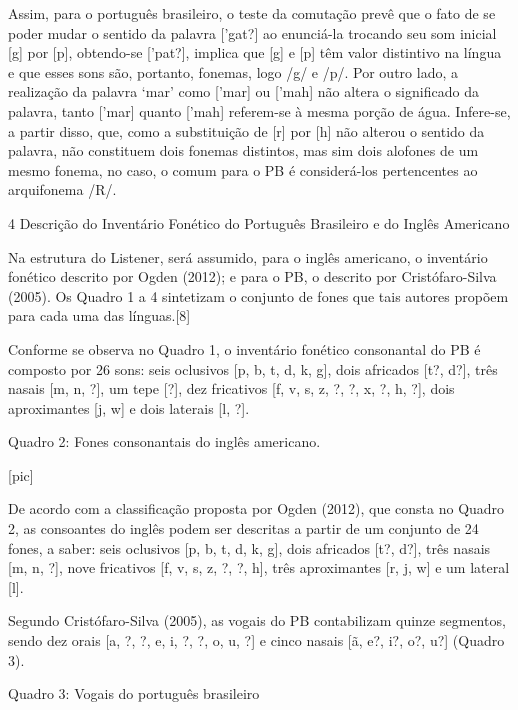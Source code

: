 Assim, para o portugu\^es brasileiro, o teste da comuta\c{c}\~ao prev\^e que o
fato de se poder mudar o sentido da palavra {[}'gat?{]} ao enunci\'a-la
trocando seu som inicial {[}g{]} por {[}p{]}, obtendo-se {[}'pat?{]},
implica que {[}g{]} e {[}p{]} t\^em valor distintivo na l\'ingua e que esses
sons s\~ao, portanto, fonemas, logo /g/ e /p/. Por outro lado, a
realiza\c{c}\~ao da palavra `mar' como {[}'mar{]} ou {[}'mah{]} n\~ao altera o
significado da palavra, tanto {[}'mar{]} quanto {[}'mah{]} referem-se à
mesma por\c{c}\~ao de \'agua. Infere-se, a partir disso, que, como a
substitui\c{c}\~ao de {[}r{]} por {[}h{]} n\~ao alterou o sentido da palavra,
n\~ao constituem dois fonemas distintos, mas sim dois alofones de um mesmo
fonema, no caso, o comum para o PB \'e consider\'a-los pertencentes ao
arquifonema /R/.

4 Descri\c{c}\~ao do Invent\'ario Fon\'etico do Portugu\^es Brasileiro e do Ingl\^es
Americano

Na estrutura do Listener, ser\'a assumido, para o ingl\^es americano, o
invent\'ario fon\'etico descrito por Ogden (2012); e para o PB, o descrito
por Crist\'ofaro-Silva (2005). Os Quadro 1 a 4 sintetizam o conjunto de
fones que tais autores prop\~oem para cada uma das l\'inguas.{[}8{]}



Conforme se observa no Quadro 1, o invent\'ario fon\'etico consonantal do PB
\'e composto por 26 sons: seis oclusivos {[}p, b, t, d, k, g{]}, dois
africados {[}t?, d?{]}, tr\^es nasais {[}m, n, ?{]}, um tepe {[}?{]}, dez
fricativos {[}f, v, s, z, ?, ?, x, ?, h, ?{]}, dois aproximantes {[}j,
w{]} e dois laterais {[}l, ?{]}.

          Quadro 2: Fones consonantais do ingl\^es americano.

                                [pic]

De acordo com a classifica\c{c}\~ao proposta por Ogden (2012), que consta no
Quadro 2, as consoantes do ingl\^es podem ser descritas a partir de um
conjunto de 24 fones, a saber: seis oclusivos {[}p, b, t, d, k, g{]},
dois africados {[}t?, d?{]}, tr\^es nasais {[}m, n, ?{]}, nove fricativos
{[}f, v, s, z, ?, ?, h{]}, tr\^es aproximantes {[}r, j, w{]} e um lateral
{[}l{]}.

Segundo Crist\'ofaro-Silva (2005), as vogais do PB contabilizam quinze
segmentos, sendo dez orais {[}a, ?, ?, e, i, ?, ?, o, u, ?{]} e cinco
nasais {[}\~a, e?, i?, o?, u?{]} (Quadro 3).

              Quadro 3: Vogais do portugu\^es brasileiro


